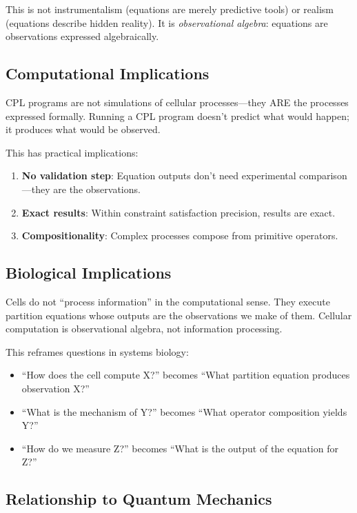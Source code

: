\documentclass[aps,prd,twocolumn,superscriptaddress,floatfix,nofootinbib]{revtex4-2}
\theoremstyle{remark}
\begin{document}
This is not instrumentalism (equations are merely predictive tools) or realism (equations describe hidden reality). It is \emph{observational algebra}: equations are observations expressed algebraically.

\subsection{Computational Implications}

CPL programs are not simulations of cellular processes---they ARE the processes expressed formally. Running a CPL program doesn't predict what would happen; it produces what would be observed.

This has practical implications:
\begin{enumerate}
\item \textbf{No validation step}: Equation outputs don't need experimental comparison---they are the observations.
\item \textbf{Exact results}: Within constraint satisfaction precision, results are exact.
\item \textbf{Compositionality}: Complex processes compose from primitive operators.
\end{enumerate}

\subsection{Biological Implications}

Cells do not ``process information'' in the computational sense. They execute partition equations whose outputs are the observations we make of them. Cellular computation is observational algebra, not information processing.

This reframes questions in systems biology:
\begin{itemize}
\item ``How does the cell compute X?'' becomes ``What partition equation produces observation X?''
\item ``What is the mechanism of Y?'' becomes ``What operator composition yields Y?''
\item ``How do we measure Z?'' becomes ``What is the output of the equation for Z?''
\end{itemize}

\subsection{Relationship to Quantum Mechanics}
\end{document}
